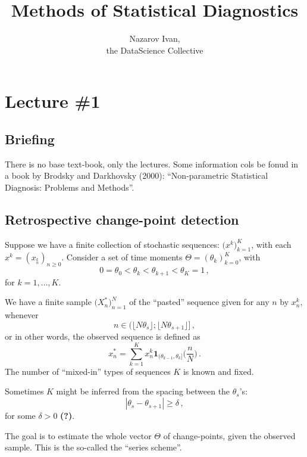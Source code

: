 \documentclass[a4paper]{article}
\title{Methods of Statistical Diagnostics}
\author{Nazarov Ivan, \rus{201мНОД(ИССА)}\\the DataScience Collective}
\newcommand{\one}{\mathbf{1}}
\newcommand{\wat}{\textbf{(?)}}
\begin{document}
\maketitle

\section{Lecture \#1} %
\label{sec:lecture_1}

\subsection{Briefing} %
\label{sub:briefing}

There is no base text-book, only the lectures. Some information cols be fonud in
a book by Brodsky and Darkhovsky (2000): ``Non-parametric Statistical Diagnosis:
Problems and Methods''.


\subsection{Retrospective change-point detection} %
\label{sub:retrospective_change_point_detection}

Suppose we have a finite collection of stochastic sequences: $\biggl(x^k\biggr)_{k=1}^K$,
with each $x^k = (x_^k_n)_{n\geq 0}$. Consider a set of time moments
$\Theta = (\theta_k)_{k=0}^K$, with
\[0 = \theta_0 < \theta_k < \theta_{k+1} < \theta_K = 1 \,,\]
for $k=1,\ldots,K$.

We have a finite sample $\big(X^*_n\bigr)_{n=1}^N$ of the ``pasted'' sequence
given for any $n$ by $x^k_n$, whenever
\[ n\in ( \bigl\lfloor N\theta_s \bigr\rfloor; \bigl\lfloor N\theta_{s+1} \bigr\rfloor ] \,,\]
or in other words, the observed sequence is defined as
\[ x^*_n = \sum_{k=1}^K x^k_n \one_{(\theta_{k-1}, \theta_k]}\biggl( \frac{n}{N} \biggr) \,. \]
The number of ``mixed-in'' types of sequences $K$ is known and fixed.


Sometimes $K$ might be inferred from the spacing between the $\theta_s$'s:
\[ |\theta_s - \theta_{s+1} | \geq \delta \,, \]
for some $\delta > 0$ \wat.

The goal is to estimate the whole vector $\Theta$ of change-points, given
the observed sample. This is the so-called the ``series scheme''.
\end{document}
